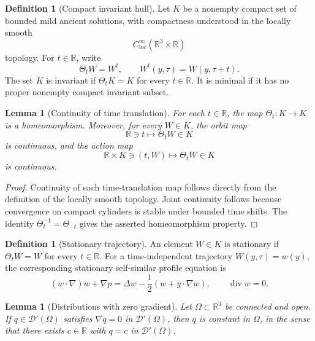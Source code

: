 \documentclass[11pt]{amsart}
\theoremstyle{plain}
\newtheorem{lemma}[theorem]{Lemma}
\theoremstyle{definition}
\newtheorem{definition}[theorem]{Definition}
\theoremstyle{remark}
\numberwithin{equation}{section}
\begin{document}
\begin{definition}[Compact invariant hull]\label{def:compact-hull}
Let \(K\) be a nonempty compact set of bounded mild ancient solutions, with
compactness understood in the locally smooth
\[
   C^\infty_{\mathrm{loc}}(\mathbb R^3\times\mathbb R)
\]
topology.  For \(t\in\mathbb R\), write
\[
   \Theta_tW=W^t,\qquad W^t(y,\tau)=W(y,\tau+t).
\]
The set \(K\) is invariant if \(\Theta_tK=K\) for every \(t\in\mathbb R\).  It
is minimal if it has no proper nonempty compact invariant subset.
\end{definition}

\begin{lemma}[Continuity of time translation]\label{lem:translation-continuity}
For each \(t\in\mathbb R\), the map \(\Theta_t:K\to K\) is a homeomorphism.
Moreover, for every \(W\in K\), the orbit map
\[
   \mathbb R\ni t\mapsto \Theta_tW\in K
\]
is continuous, and the action map
\[
   \mathbb R\times K\ni(t,W)\mapsto\Theta_tW\in K
\]
is continuous.
\end{lemma}

\begin{proof}
Continuity of each time-translation map follows directly from the definition
of the locally smooth topology.  Joint continuity follows because convergence
on compact cylinders is stable under bounded time shifts.  The identity
\(\Theta_t^{-1}=\Theta_{-t}\) gives the asserted homeomorphism property.
\end{proof}

\begin{definition}[Stationary trajectory]\label{def:stationary}
An element \(W\in K\) is stationary if \(\Theta_tW=W\) for every
\(t\in\mathbb R\).  For a time-independent trajectory \(W(y,\tau)=w(y)\), the
corresponding stationary self-similar profile equation is
\begin{equation}\label{eq:stationary}
   (w\cdot\nabla)w+\nabla p
   =
   \Delta w-\frac12(w+y\cdot\nabla w),
   \qquad \operatorname{div}w=0 .
\end{equation}
\end{definition}

\begin{lemma}[Distributions with zero gradient]\label{lem:zero-gradient-constant}
Let \(\Omega\subset\mathbb R^3\) be connected and open.  If
\(q\in\mathcal D'(\Omega)\) satisfies \(\nabla q=0\) in
\(\mathcal D'(\Omega)\), then \(q\) is constant in \(\Omega\), in the sense
that there exists \(c\in\mathbb R\) with \(q=c\) in \(\mathcal D'(\Omega)\).
\end{lemma}
\end{document}
